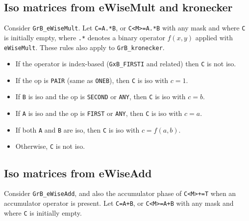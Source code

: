\documentclass[12pt]{article}
\begin{document}
\subsection{Iso matrices from eWiseMult and kronecker}
\label{iso_emult}

Consider \verb'GrB_eWiseMult'.  Let
\verb'C=A.*B', or \verb'C<M>=A.*B' with any mask and where \verb'C' is
initially empty, where \verb'.*' denotes a binary operator $f(x,y)$
applied with \verb'eWiseMult'.  These rules also apply to \verb'GrB_kronecker'.

    \begin{itemize}
    \item If the operator is index-based (\verb'GxB_FIRSTI' and related) then
    \verb'C' is not iso.

    \item If the op is \verb'PAIR' (same as \verb'ONEB'),
        then \verb'C' is iso with $c=1$.

    \item If \verb'B' is iso and the op is \verb'SECOND' or \verb'ANY',
        then \verb'C' is iso with $c=b$.

    \item If \verb'A' is iso and the op is \verb'FIRST' or \verb'ANY',
        then \verb'C' is iso with $c=a$.

    \item If both \verb'A' and \verb'B' are iso,
        then \verb'C' is iso with $c=f(a,b)$.

    \item Otherwise, \verb'C' is not iso.
    \end{itemize}

\subsection{Iso matrices from eWiseAdd}
\label{iso_add}

Consider \verb'GrB_eWiseAdd', and also the accumulator phase of \verb'C<M>+=T'
when an accumulator operator is present.  Let \verb'C=A+B', or \verb'C<M>=A+B'
with any mask and where \verb'C' is initially empty.
\end{document}
